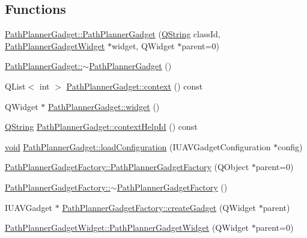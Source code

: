 \subsection*{\-Functions}
\begin{DoxyCompactItemize}
\item 
\hyperlink{group___path_planner_gadget_plugin_gac805c31521687b90ca55ae17a24e2cb0}{\-Path\-Planner\-Gadget\-::\-Path\-Planner\-Gadget} (\hyperlink{group___u_a_v_objects_plugin_gab9d252f49c333c94a72f97ce3105a32d}{\-Q\-String} class\-Id, \hyperlink{class_path_planner_gadget_widget}{\-Path\-Planner\-Gadget\-Widget} $\ast$widget, \-Q\-Widget $\ast$parent=0)
\item 
\hyperlink{group___path_planner_gadget_plugin_ga6531735ac3658c46d3d3dd5ddd539f58}{\-Path\-Planner\-Gadget\-::$\sim$\-Path\-Planner\-Gadget} ()
\item 
\-Q\-List$<$ int $>$ \hyperlink{group___path_planner_gadget_plugin_ga6c2bd0fcf98faa6389c96a15430723d7}{\-Path\-Planner\-Gadget\-::context} () const 
\item 
\-Q\-Widget $\ast$ \hyperlink{group___path_planner_gadget_plugin_ga4a83272b91f2a0359dfb4d3d950c6ae4}{\-Path\-Planner\-Gadget\-::widget} ()
\item 
\hyperlink{group___u_a_v_objects_plugin_gab9d252f49c333c94a72f97ce3105a32d}{\-Q\-String} \hyperlink{group___path_planner_gadget_plugin_ga214a421178941f98f54bd3588c1634bc}{\-Path\-Planner\-Gadget\-::context\-Help\-Id} () const 
\item 
\hyperlink{group___u_a_v_objects_plugin_ga444cf2ff3f0ecbe028adce838d373f5c}{void} \hyperlink{group___path_planner_gadget_plugin_ga7606029076dafbc5e187ffeea2cbfdac}{\-Path\-Planner\-Gadget\-::load\-Configuration} (\-I\-U\-A\-V\-Gadget\-Configuration $\ast$config)
\item 
\hyperlink{group___path_planner_gadget_plugin_ga88e48bf90ce31bd235b33782dfe905e9}{\-Path\-Planner\-Gadget\-Factory\-::\-Path\-Planner\-Gadget\-Factory} (\-Q\-Object $\ast$parent=0)
\item 
\hyperlink{group___path_planner_gadget_plugin_ga2dfd582034d463500837f0eaf0d01bd6}{\-Path\-Planner\-Gadget\-Factory\-::$\sim$\-Path\-Planner\-Gadget\-Factory} ()
\item 
\-I\-U\-A\-V\-Gadget $\ast$ \hyperlink{group___path_planner_gadget_plugin_gaae19a3f321bbfe2ff8c6f75d2202d22e}{\-Path\-Planner\-Gadget\-Factory\-::create\-Gadget} (\-Q\-Widget $\ast$parent)
\item 
\hyperlink{group___path_planner_gadget_plugin_gaa5a16b8b25c368ba63764246fe417001}{\-Path\-Planner\-Gadget\-Widget\-::\-Path\-Planner\-Gadget\-Widget} (\-Q\-Widget $\ast$parent=0)

\end{DoxyCompactItemize}
